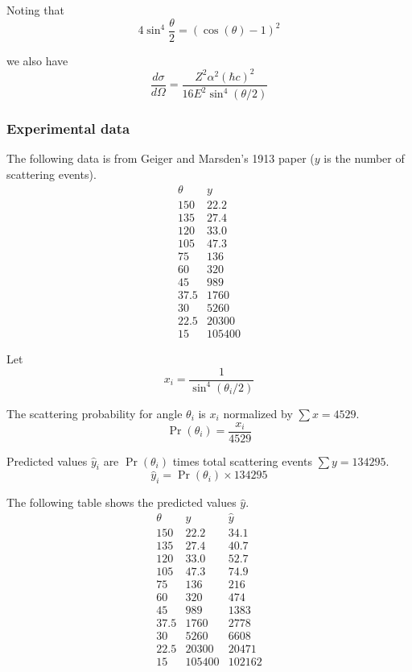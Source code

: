 Noting that
\begin{equation*}
4\sin^4\frac{\theta}{2}=(\cos(\theta)-1)^2
\end{equation*}

we also have
\begin{equation*}
\frac{d\sigma}{d\Omega}=\frac{Z^2\alpha^2(\hbar c)^2}{16E^2\sin^4(\theta/2)}
\end{equation*}

\subsubsection*{Experimental data}
The following data is from Geiger and Marsden's 1913 paper
($y$ is the number of scattering events).
\begin{equation*}
\begin{matrix}
\theta & y\\
150 & 22.2\\
135 & 27.4\\
120 & 33.0\\
105 & 47.3\\
75 & 136\\
60 & 320\\
45 & 989\\
37.5 & 1760\\
30 & 5260\\
22.5 & 20300\\
15 & 105400
\end{matrix}
\end{equation*}

Let
\begin{equation*}
x_i=\frac{1}{\sin^4(\theta_i/2)}
\end{equation*}

The scattering probability for angle $\theta_i$ is $x_i$ normalized by $\sum x=4529$.
\begin{equation*}
\Pr(\theta_i)=\frac{x_i}{4529}
\end{equation*}

Predicted values $\hat y_i$ are $\Pr(\theta_i)$
times total scattering events $\sum y=134295$.
\begin{equation*}
\hat y_i=\Pr(\theta_i)\times134295
\end{equation*}

The following table shows the predicted values $\hat y$.
\begin{equation*}
\begin{matrix}
\theta & y & \hat y\\
150 & 22.2 & 34.1\\
135 & 27.4 & 40.7\\
120 & 33.0 & 52.7\\
105 & 47.3 & 74.9\\
75 & 136 & 216\\
60 & 320 & 474\\
45 & 989 & 1383\\
37.5 & 1760 & 2778\\
30 & 5260 & 6608\\
22.5 & 20300 & 20471\\
15 & 105400 & 102162
\end{matrix}
\end{equation*}


